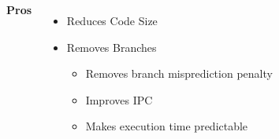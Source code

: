 \begin{columns}[t] %
        \textbf{Pros}
        \begin{itemize}
            \item Reduces Code Size
            \item Removes Branches
            \begin{itemize}
                \item Removes branch misprediction penalty
                \item Improves IPC
                \item Makes execution time predictable
            \end{itemize}
        \end{itemize}


\end{columns}